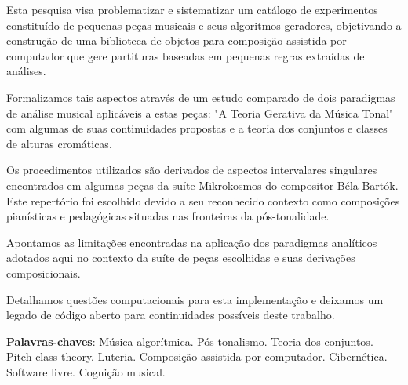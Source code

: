 \documentclass[
	12pt,				%
	openright,			%
	twoside,			%
	a4paper,			%
	english,			%
	french,				%
	spanish,			%
	brazil				%
	]{abntex2}
\begin{document}
\setlength{\absparsep}{18pt} %
\begin{resumo}


Esta pesquisa visa problematizar e sistematizar um catálogo de experimentos constituído de pequenas peças musicais e seus algoritmos geradores, objetivando a construção de uma biblioteca de objetos para composição assistida por computador que gere partituras baseadas em pequenas regras extraídas de análises.

Formalizamos tais aspectos através de um estudo comparado de dois paradigmas de análise musical aplicáveis a estas peças: "A Teoria Gerativa da Música Tonal"\cite{lerdahl1983generative} com algumas de suas continuidades propostas \cite{lerdahl2009genesis,temperley2004cognition} e a teoria dos conjuntos e classes de alturas cromáticas.\cite{forte1973structure,straus2004}

Os procedimentos utilizados são derivados de aspectos intervalares singulares encontrados em algumas peças da suíte Mikrokosmos do compositor Béla Bartók. Este repertório foi escolhido devido a seu reconhecido contexto como composições pianísticas e pedagógicas situadas nas fronteiras da pós-tonalidade. 

Apontamos as limitações encontradas na aplicação dos paradigmas analíticos adotados aqui no contexto da suíte de peças escolhidas e suas derivações composicionais.

Detalhamos questões computacionais para esta implementação e deixamos um legado de código aberto para continuidades possíveis deste trabalho.


 \textbf{Palavras-chaves}: Música algorítmica. Pós-tonalismo. Teoria dos conjuntos. Pitch class theory. Luteria. Composição assistida por computador. Cibernética. Software livre. Cognição musical.
\end{resumo}
\end{document}
